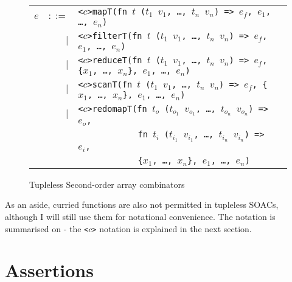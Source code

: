 \begin{figure}[bt]
\begin{tabular}{lrll}
$e$ & $::=$ & \texttt{<$c$>mapT(fn $t$ ($t_{1}$ $v_{1}$, \ldots, $t_{n}$ $v_{n}$) => $e_f$, $e_{1}$, \ldots, $e_{n}$)} \\
    & $|$ & \texttt{<$c$>filterT(fn $t$ ($t_{1}$ $v_{1}$, \ldots, $t_{n}$ $v_{n}$) => $e_f$, $e_{1}$, \ldots, $e_{n}$)} \\
    & $|$ & \texttt{<$c$>reduceT(fn $t$ ($t_{1}$ $v_{1}$, \ldots, $t_{n}$ $v_{n}$) => $e_f$, \{$x_{1}$, \ldots, $x_{n}$\}, $e_{1}$, \ldots, $e_{n}$)} \\
    & $|$ & \texttt{<$c$>scanT(fn $t$ ($t_{1}$ $v_{1}$, \ldots, $t_{n}$ $v_{n}$) => $e_f$, \{$x_{1}$, \ldots, $x_{n}$\}, $e_{1}$, \ldots, $e_{n}$)} \\
    & $|$ & \texttt{<$c$>redomapT(fn $t_{o}$ ($t_{o_{1}}$ $v_{o_{1}}$, \ldots, $t_{o_{n}}$ $v_{o_{n}}$) => $e_o$,} \\
    &     & \texttt{\ \ \ \ \ \ \ \ \ \ \ \ fn $t_{i}$ ($t_{i_{1}}$ $v_{i_{1}}$, \ldots, $t_{i_{n}}$ $v_{i_{n}}$) => $e_i$,} \\
    &     & \texttt{\ \ \ \ \ \ \ \ \ \ \ \ \{$x_{1}$, \ldots, $x_{n}$\}, $e_{1}$, \ldots, $e_{n}$)} \\
\end{tabular}
\caption{Tupleless Second-order array combinators}
\label{fig:tupleless-soacs}
\end{figure}

As an aside, curried functions are also not permitted in tupleless
SOACs, although I will still use them for notational convenience.  The
notation is summarised on  - the
\texttt{<$c$>} notation is explained in the next section.

\section{Assertions}
\label{sec:assertions}

